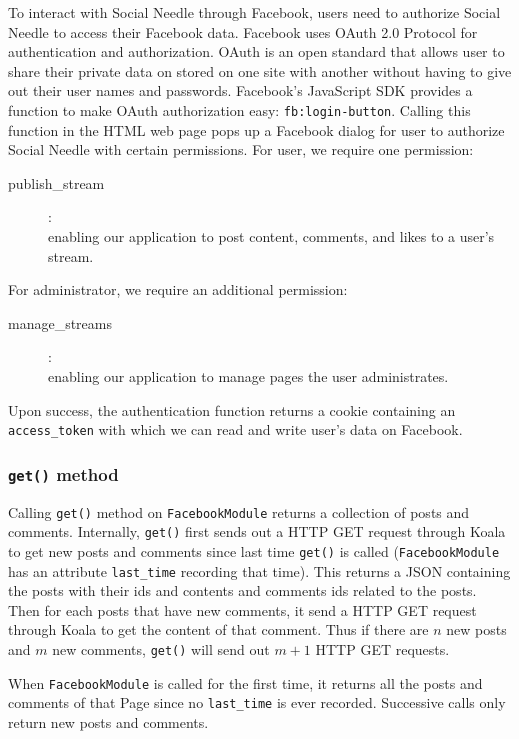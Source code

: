 To interact with Social Needle through Facebook, users need to authorize Social Needle to access their Facebook data. Facebook uses OAuth 2.0 Protocol for authentication and authorization. OAuth is an open standard that allows user to share their private data on stored on one site with another without having to give out their user names and passwords. Facebook's JavaScript SDK provides a function to make OAuth authorization easy: \texttt{fb:login-button}. Calling this function in the HTML web page pops up a Facebook dialog for user to authorize Social Needle with certain permissions. For user, we require one permission: 
\begin{description}
	\item[publish\_stream]: \hfill \\
	enabling our application to post content, comments, and likes to a user's stream.
\end{description}
 For administrator, we require an additional permission: 
\begin{description}
	\item[manage\_streams]: \hfill \\
	enabling our application to manage pages the user administrates. 
\end{description} Upon success, the authentication function returns a cookie containing an \texttt{access\_token} with which we can read and write user's data on Facebook.


\subsubsection{\texttt{get()} method} %
\label{ssub:get()_method}

Calling \texttt{get()} method on \texttt{FacebookModule} returns a collection of posts and comments. Internally, \texttt{get()} first sends out a HTTP GET request through Koala to get new posts and comments since last time \texttt{get()} is called (\texttt{FacebookModule} has an attribute \texttt{last\_time} recording that time). This returns a JSON containing the posts with their ids and contents and comments ids related to the posts. Then for each posts that have new comments, it send a HTTP GET request through Koala to get the content of that comment. 
Thus if there are $n$ new posts and $m$ new comments, \texttt{get()} will send out $m+1$ HTTP GET requests.

When \texttt{FacebookModule} is called for the first time, it returns all the posts and comments of that Page since no \texttt{last\_time} is ever recorded. Successive calls only return new posts and comments.

